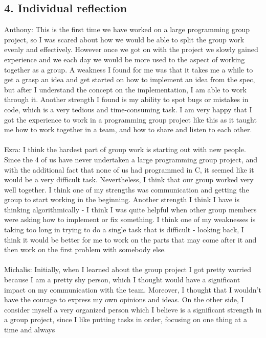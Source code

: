 \documentclass[a4paper]{article}
\begin{document}
\bigskip
\bigskip

\subsection*{4. Individual reflection}

Anthony: This is the first time we have worked on a large programming group project, so I was scared about how we would be 
able to split the group work evenly and effectively. However once we got on with the project we slowly gained experience 
and we each day we would be more used to the aspect of working together as a group. A weakness I found for me was that it 
takes me a while to get a grasp an idea and get started on how to implement an idea from the spec, but after I understand 
the concept on the implementation, I am able to work through it. Another strength I found is my ability to spot bugs or 
mistakes in code, which is a very tedious and time-consuming task. I am very happy that I got the experience to work in a 
programming group project like this as it taught me how to work together in a team, and how to share and listen to each other.
\\ \\
Ezra: I think the hardest part of group work is starting out with new people. Since the 4 of us have never undertaken a 
large programming group project, and with the additional fact that none of us had programmed in C, it seemed like it would
be a very difficult task. Nevertheless, I think that our group worked very well together. I think one of my strengths was 
communication and getting the group to start working in the beginning. Another strength I think I have is thinking algorithmically - 
I think I was quite helpful when other group members were asking how to implement or fix something. I think one of my weaknesses is 
taking too long in trying to do a single task that is difficult - looking back, I think it would be better for me to work on the parts 
that may come after it and then work on the first problem with somebody else.
\\ \\
Michalis: Initially, when I learned about the group project I got pretty worried because I am a pretty shy person, which 
I thought would have a significant impact on my communication with the team. Moreover, I thought that I wouldn't have the courage 
to express my own opinions and ideas. On the other side, I consider myself a very organized person which I believe is 
a significant strength in a group project, since I like putting tasks in order, focusing on one thing at a time and always 
\end{document}
